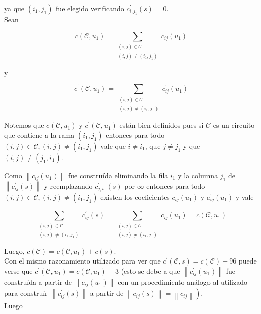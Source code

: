 \documentclass[10pt]{article}
\begin{document}
ya que $\left(i_{1}, j_{1}\right)$ fue elegido verificando $c_{i_{1} j_{1}}^{\prime}(s)=0$.\\
Sean

$$
c\left(\mathcal{C}, u_{1}\right)=\sum_{\substack{(i, j) \in \mathcal{C} \\(i, j) \neq\left(i_{1}, j_{1}\right)}} c_{i j}\left(u_{1}\right)
$$

y

$$
c^{\prime}\left(\mathcal{C}, u_{1}\right)=\sum_{\substack{(i, j) \in \mathcal{C} \\(i, j) \neq\left(i_{1}, j_{1}\right)}} c_{i j}^{\prime}\left(u_{1}\right)
$$

Notemos que $c\left(\mathcal{C}, u_{1}\right)$ y $c^{\prime}\left(\mathcal{C}, u_{1}\right)$ están bien definidos pues si $\mathcal{C}$ es un circuito que contiene a la rama $\left(i_{1}, j_{1}\right)$ entonces para todo $(i, j) \in \mathcal{C},(i, j) \neq\left(i_{1}, j_{1}\right)$ vale que $i \neq i_{1}$, que $j \neq j_{1}$ y que $(i, j) \neq\left(j_{1}, i_{1}\right)$.

Como $\left\|c_{i j}\left(u_{1}\right)\right\|$ fue construída eliminando la fila $i_{1}$ y la columna $j_{1}$ de $\left\|c_{i j}^{\prime}(s)\right\|$ y reemplazando $c_{j_{1} i_{1}}^{\prime}(s)$ por $\infty$ entonces para todo $(i, j) \in \mathcal{C},(i, j) \neq\left(i_{1}, j_{1}\right)$ existen los coeficientes $c_{i j}\left(u_{1}\right)$ y $c_{i j}^{\prime}\left(u_{1}\right)$ y vale

$$
\sum_{\substack{(i, j) \in \mathcal{C} \\(i, j) \neq\left(i_{1}, j_{1}\right)}} c_{i j}^{\prime}(s)=\sum_{\substack{(i, j) \in \mathcal{C} \\(i, j) \neq\left(i_{1}, j_{1}\right)}} c_{i j}\left(u_{1}\right)=c\left(\mathcal{C}, u_{1}\right)
$$

Luego, $c(\mathcal{C})=c\left(\mathcal{C}, u_{1}\right)+c(s)$.\\
Con el mismo razonamiento utilizado para ver que $c^{\prime}(\mathcal{C}, s)=c(\mathcal{C})-96$ puede verse que $c^{\prime}\left(\mathcal{C}, u_{1}\right)=c\left(\mathcal{C}, u_{1}\right)-3$ (esto se debe a que $\left\|c_{i j}^{\prime}\left(u_{1}\right)\right\|$ fue construída a partir de $\left\|c_{i j}\left(u_{1}\right)\right\|$ con un procedimiento análogo al utilizado para construír $\left\|c_{i j}^{\prime}(s)\right\|$ a partir de $\left.\left\|c_{i j}(s)\right\|=\left\|c_{i j}\right\|\right)$.\\
Luego
\end{document}
